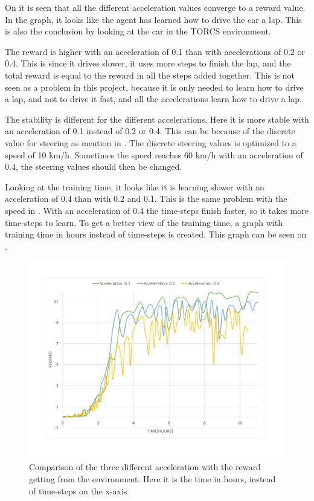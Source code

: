 On  it is seen that all the different acceleration values converge to a reward value. In the graph, it looks like the agent has learned how to drive the car a lap. This is also the conclusion by looking at the car in the TORCS environment. 

The reward is higher with an acceleration of 0.1 than with accelerations of 0.2 or 0.4. This is since it drives slower, it uses more steps to finish the lap, and the total reward is equal to the reward in all the steps added together. This is not seen as a problem in this project, because it is only needed to learn how to drive a lap, and not to drive it fast, and all the accelerations learn how to drive a lap.

The stability is different for the different accelerations. Here it is more stable with an acceleration of 0.1 instead of 0.2 or 0.4. This can be because of the discrete value for steering as mention in . The discrete steering values is optimized to a speed of 10 km/h. Sometimes the speed reaches 60 km/h with an acceleration of 0.4, the steering values should then be changed.  

Looking at the training time, it looks like it is learning slower with an acceleration of 0.4 than with 0.2 and 0.1. This is the same problem with the speed in . With an acceleration of 0.4 the time-steps finish faster, so it takes more time-steps to learn. To get a better view of the training time, a graph with training time in hours instead of time-steps is created. This graph can be seen on .       

\begin{figure}[H]
	\centering
	\includegraphics[width=1\textwidth]{Figures/Result/change_of_acceleration_new_reward_hours_graph.pdf}
	\caption{Comparison of the three different acceleration with the reward getting from the environment. Here it is the time in hours, instead of time-steps on the x-axis}
	\label{fig:change_of_acceleration_new_reward_hours_graph}
\end{figure}

